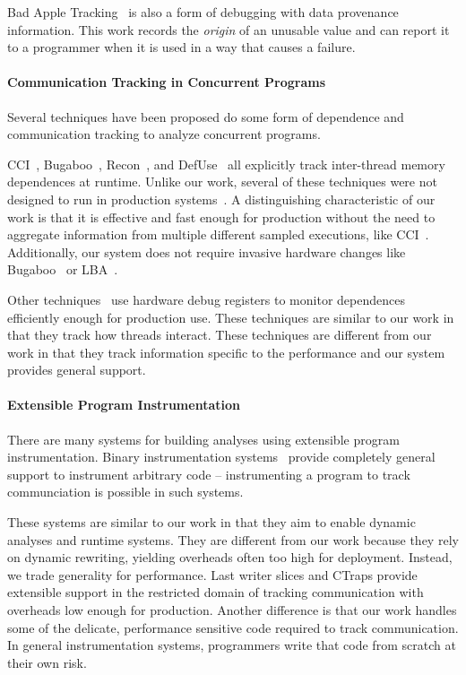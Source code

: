 \documentclass[preprint,9pt]{sigplanconf}
\newcommand{\ctraps}{CTraps\xspace}
\begin{document}
Bad Apple Tracking~\cite{bondapple} is also a form of debugging with data
provenance information. This work records the {\em origin} of an unusable value
and can report it to a programmer when it is used in a way that causes a
failure.

\paragraph{Communication Tracking in Concurrent Programs}
Several techniques have been proposed do some form of dependence and
communication tracking to analyze concurrent programs.  

CCI~\cite{cci}, Bugaboo~\cite{bugaboo}, Recon~\cite{recon}, and
DefUse~\cite{defuse} all explicitly track inter-thread memory dependences at
runtime.  Unlike our work, several of these techniques were not designed to run
in production systems~\cite{recon,defuse}.  A distinguishing characteristic of
our work is that it is effective and fast enough for production without the
need to aggregate information from multiple different sampled executions, like
CCI~\cite{cci}.  Additionally, our system does not require invasive hardware
changes like Bugaboo~\cite{bugaboo} or LBA~\cite{paralog}.

Other techniques~\cite{threadclustering,threadcriticality} use  hardware debug
registers to monitor dependences efficiently enough for production use.  These
techniques are similar to our work in that they track how threads interact.
These techniques are different from our work in that they track information
specific to the performance and our system provides general support.

\paragraph{Extensible Program Instrumentation}
There are many systems for building analyses using extensible program
instrumentation.  Binary instrumentation
systems~\cite{pin,dynamorio,valgrind,roadrunner} provide completely general
support to instrument arbitrary code -- instrumenting a program to track
communciation is possible in such systems.  

These systems are similar to our work in that they aim to enable dynamic
analyses and runtime systems.  They are different from our work because they
rely on dynamic rewriting, yielding overheads often too high for deployment.
Instead, we trade generality for performance. Last writer slices and \ctraps
provide extensible support in the restricted domain of tracking communication
with overheads low enough for production.  Another difference is that our work
handles some of the delicate, performance sensitive code required to track
communication.  In general instrumentation systems, programmers write that code
from scratch at their own risk.  
\end{document}
